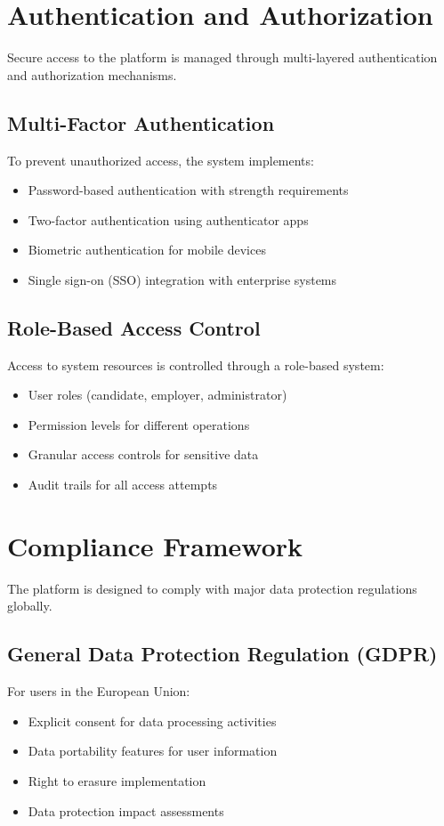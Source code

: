\documentclass[12pt,a4paper]{report}
\begin{document}
\section{Authentication and Authorization}
Secure access to the platform is managed through multi-layered authentication and authorization mechanisms.

\subsection{Multi-Factor Authentication}
To prevent unauthorized access, the system implements:
\begin{itemize}[leftmargin=2em]
  \item Password-based authentication with strength requirements
  \item Two-factor authentication using authenticator apps
  \item Biometric authentication for mobile devices
  \item Single sign-on (SSO) integration with enterprise systems
\end{itemize}

\subsection{Role-Based Access Control}
Access to system resources is controlled through a role-based system:
\begin{itemize}[leftmargin=2em]
  \item User roles (candidate, employer, administrator)
  \item Permission levels for different operations
  \item Granular access controls for sensitive data
  \item Audit trails for all access attempts
\end{itemize}

\section{Compliance Framework}
The platform is designed to comply with major data protection regulations globally.

\subsection{General Data Protection Regulation (GDPR)}
For users in the European Union:
\begin{itemize}[leftmargin=2em]
  \item Explicit consent for data processing activities
  \item Data portability features for user information
  \item Right to erasure implementation
  \item Data protection impact assessments
\end{itemize}
\end{document}

